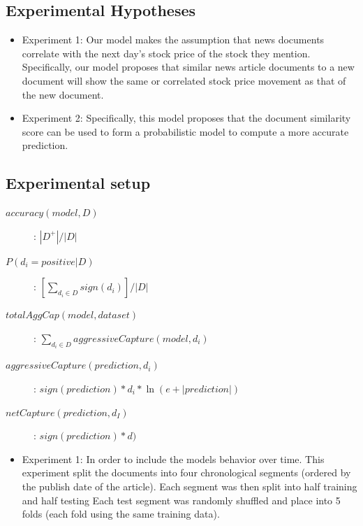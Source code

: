 \documentclass[11pt,letterpaper]{article}
\newcommand{\blue}[1]{\textcolor{RoyalBlue}{#1}}
\newcommand{\instructions}[1]{\blue{\textit{#1}}}
\begin{document}
\subsection{Experimental Hypotheses}
\label{sec:exper-hypoth}
\begin{itemize}
  \item Experiment 1: Our model makes the assumption that news documents
  correlate with the next day's stock price of the stock they mention.
  Specifically, our model proposes that similar news article documents to a new
  document will show the same or correlated stock price movement as that of the new document.
  \item Experiment 2: Specifically, this model proposes that the
  document similarity score can be used to form a probabilistic model to compute
  a more accurate prediction.
\end{itemize}

\subsection{Experimental setup}
\label{sec:experimental-setup}
\begin{description}
  \item[\(accuracy(model, D)\)] : \(|D^+| / |D|\)
  \item[\(P(d_i = positive | D)\)] : \([\sum_{d_i \in D} sign(d_i)] / |D|\)
  \item[\(totalAggCap(model, dataset)\)] : \(\sum_{d_i \in D} aggressiveCapture(model, d_i) \)
  \item[\(aggressiveCapture(prediction, d_i)\)] : \(sign(prediction) * d_i * \ln(e + |prediction|) \)
  \item[\(netCapture(prediction, d_I)\)] : \(sign(prediction) * d)\)
\end{description}

\begin{itemize}
  \item Experiment 1: In order to include the models behavior over time.
  This experiment split the documents into four chronological
  segments (ordered by the publish date of the article).
  Each segment was then split into half training and half testing
  Each test segment was randomly shuffled and place into 5 folds (each fold
  using the same training data).
\end{itemize}
\end{document}
